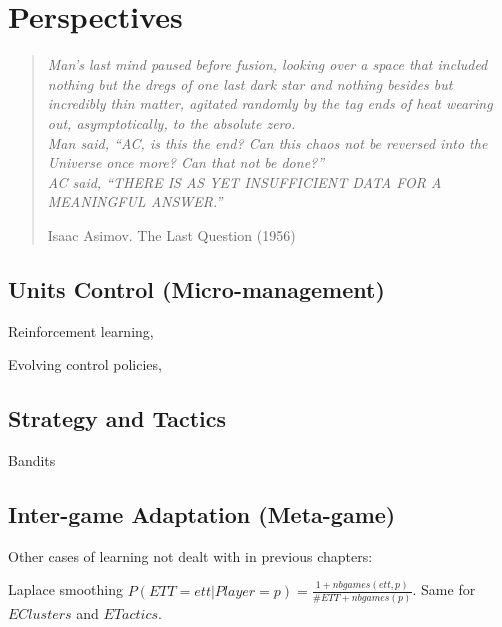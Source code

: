 \chapter{Perspectives}
\chaptertoc

\begin{quotation}\textit{
Man's last mind paused before fusion, looking over a space that included nothing but the dregs of one last dark star and nothing besides but incredibly thin matter, agitated randomly by the tag ends of heat wearing out, asymptotically, to the absolute zero.\\
Man said, ``AC, is this the end? Can this chaos not be reversed into the Universe once more? Can that not be done?''\\
AC said, ``THERE IS AS YET INSUFFICIENT DATA FOR A MEANINGFUL ANSWER.''
}
\begin{flushright}Isaac Asimov. The Last Question (1956)\end{flushright}\end{quotation}

\section{Units Control (Micro-management)}
Reinforcement learning, \citep{Marthi05concurrenthierarchical}

Evolving control policies, \citep{Miles2007}

\section{Strategy and Tactics}

Bandits

\section{Inter-game Adaptation (Meta-game)}
Other cases of learning not dealt with in previous chapters:
\citep{metalevelbehavioradaptrts}

Laplace smoothing $P(ETT=ett|Player=p)= \frac{1 + nbgames(ett,p)}{\#ETT + nbgames(p)}$. Same for $EClusters$ and $ETactics$.


